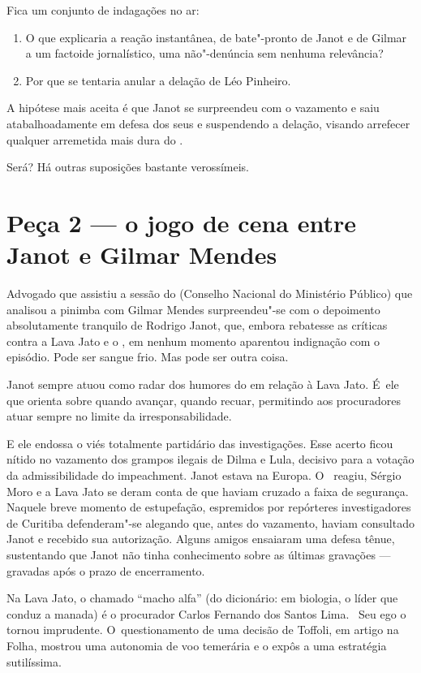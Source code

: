 Fica um conjunto de indagações no ar:

\begin{enumerate}
\itemsep1pt\parskip0pt
\item
  O que explicaria a reação instantânea, de bate"-pronto de Janot e de
  Gilmar a um factoide jornalístico, uma não"-denúncia sem nenhuma
  relevância?
\item
  Por que se tentaria anular a delação de Léo Pinheiro.
\end{enumerate}

A hipótese mais aceita é que Janot se surpreendeu com o vazamento e saiu
atabalhoadamente em defesa dos seus e suspendendo a delação, visando
arrefecer qualquer arremetida mais dura do .

Será? Há outras suposições bastante verossímeis.

\section{Peça 2 --- o jogo de cena entre Janot e Gilmar Mendes}

Advogado que assistiu a sessão do  (Conselho Nacional do Ministério
Público) que analisou a pinimba com Gilmar Mendes surpreendeu"-se com o
depoimento absolutamente tranquilo de Rodrigo Janot, que, embora
rebatesse as críticas contra a Lava Jato e o , em nenhum momento
aparentou indignação com o episódio. Pode ser sangue frio. Mas pode ser
outra coisa.

Janot sempre atuou como radar dos humores do  em relação à Lava Jato.
É~ele que orienta sobre quando avançar, quando recuar, permitindo aos
procuradores atuar sempre no limite da irresponsabilidade.

E ele endossa o viés totalmente partidário das investigações. Esse
acerto ficou nítido no vazamento dos grampos ilegais de Dilma e Lula,
decisivo para a votação da admissibilidade do impeachment. Janot estava
na Europa. O~ reagiu, Sérgio Moro e a Lava Jato se deram conta de que
haviam cruzado a faixa de segurança. Naquele breve momento de
estupefação, espremidos por repórteres investigadores de Curitiba
defenderam"-se alegando que, antes do vazamento, haviam consultado Janot
e recebido sua autorização. Alguns amigos ensaiaram uma defesa tênue,
sustentando que Janot não tinha conhecimento sobre as últimas gravações
--- gravadas após o prazo de encerramento.

Na Lava Jato, o chamado ``macho alfa'' (do dicionário: em biologia, o
líder que conduz a manada) é o procurador Carlos Fernando dos Santos
Lima. ~Seu ego o tornou imprudente. O~questionamento de uma decisão de
Toffoli, em artigo na Folha, mostrou uma autonomia de voo temerária e o
expôs a uma estratégia sutilíssima.

